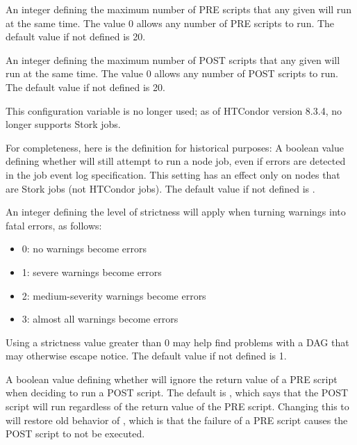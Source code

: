 \begin{description}
\label{param:DAGManMaxPreScripts}
\item[\Macro{DAGMAN\_MAX\_PRE\_SCRIPTS}]
  An integer defining the maximum number of PRE scripts that any given
   will run at the same time.  
  The value 0 allows any number of PRE scripts to run.
  The default value if not defined is 20.

\label{param:DAGManMaxPostScripts}
\item[\Macro{DAGMAN\_MAX\_POST\_SCRIPTS}]
  An integer defining the maximum number of POST scripts that any given
   will run at the same time.
  The value 0 allows any number of POST scripts to run.
  The default value if not defined is 20.

\label{param:DAGManAllowLogError}
\item[\Macro{DAGMAN\_ALLOW\_LOG\_ERROR}]
  This configuration variable is no longer used; 
  as of HTCondor version 8.3.4,  no longer supports Stork jobs.

  For completeness, here is the definition for historical purposes: 
  A boolean value defining whether  will still attempt
  to run a node job, even if errors are detected in the job event log
  specification.  This setting has an effect only on nodes that are
  Stork jobs (not HTCondor jobs).  The default value if not defined is
  .

\label{param:DAGManUseStrict}
\item[\Macro{DAGMAN\_USE\_STRICT}]
  An integer defining the level of strictness  will apply
  when turning warnings into fatal errors, as follows:
  \begin{itemize}
    \item 0: no warnings become errors
    \item 1: severe warnings become errors
    \item 2: medium-severity warnings become errors
    \item 3: almost all warnings become errors
  \end{itemize}
  Using a strictness value greater than 0 may help find problems with
  a DAG that may otherwise escape notice.
  The default value if not defined is 1.

\label{param:DAGmanAlwaysRunPost}
\item[\Macro{DAGMAN\_ALWAYS\_RUN\_POST}]
  A boolean value defining whether  will ignore the return value
  of a PRE script when deciding to run a POST script.  The default is
  , which says that the POST script will run regardless of the return
  value of the PRE script. Changing this to  will restore old
  behavior of , which is that the failure of a PRE script causes
  the POST script to not be executed.


\end{description}
